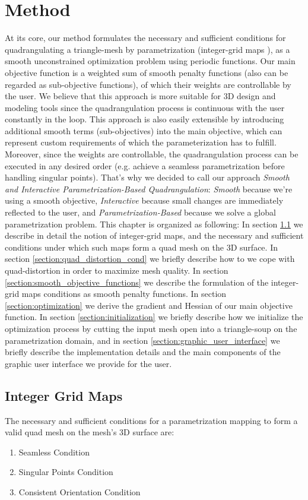 \chapter{Method}
\label{chapter:method}
At its core, our method formulates the necessary and sufficient conditions for quadrangulating a triangle-mesh by parametrization (integer-grid maps \cite{bommes:hal-00862648}), as a smooth unconstrained optimization problem using periodic functions. Our main objective function is a weighted sum of smooth penalty functions (also can be regarded as sub-objective functions), of which their weights are controllable by the user. We believe that this approach is more suitable for 3D design and modeling tools since the quadrangulation process is continuous with the user constantly in the loop. This approach is also easily extensible by introducing additional smooth terms (sub-objectives) into the main objective, which can represent custom requirements of which the parameterization has to fulfill. Moreover, since the weights are controllable, the quadrangulation process can be executed in any desired order (e.g. achieve a seamless parametrization before handling singular points). That's why we decided to call our approach \emph{Smooth and Interactive Parametrization-Based Quadrangulation}: \emph{Smooth} because we're using a smooth objective, \emph{Interactive} because small changes are immediately reflected to the user, and \emph{Parametrization-Based} because we solve a global parametrization problem. This chapter is organized as following: In section \ref{integer-grid-maps} we describe in detail the notion of integer-grid maps, and the necessary and sufficient conditions under which such maps form a quad mesh on the 3D surface. In section \ref{section:quad_distortion_cond} we briefly describe how to we cope with quad-distortion in order to maximize mesh quality. In section \ref{section:smooth_objective_functions} we describe the formulation of the integer-grid maps conditions as smooth penalty functions. In section \ref{section:optimization} we derive the gradient and Hessian of our main objective function. In section \ref{section:initialization} we briefly describe how we initialize the optimization process by cutting the input mesh open into a triangle-soup on the parametrization domain, and in section \ref{section:graphic_user_interface} we briefly describe the implementation details and the main components of the graphic user interface we provide for the user.
\section{Integer Grid Maps}
\label{integer-grid-maps}
The necessary and sufficient conditions for a parametrization mapping to form a valid quad mesh on the mesh's 3D surface are:
\begin{enumerate}
\item Seamless Condition
\item Singular Points Condition
\item Consistent Orientation Condition
\end{enumerate}
